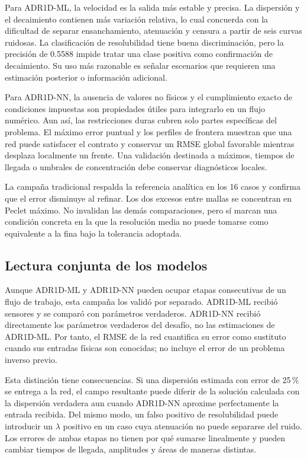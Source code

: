 \documentclass[11pt,a4paper]{article}
\begin{document}
Para ADR1D-ML, la velocidad es la salida más estable y precisa. La dispersión y
el decaimiento contienen más variación relativa, lo cual concuerda con la
dificultad de separar ensanchamiento, atenuación y censura a partir de seis
curvas ruidosas. La clasificación de resolubilidad tiene buena discriminación,
pero la precisión de 0.5588 impide tratar una clase positiva como confirmación
de decaimiento. Su uso más razonable es señalar escenarios que requieren una
estimación posterior o información adicional.

Para ADR1D-NN, la ausencia de valores no físicos y el cumplimiento exacto de
condiciones impuestas son propiedades útiles para integrarlo en un flujo
numérico. Aun así, las restricciones duras cubren solo partes específicas del
problema. El máximo error puntual y los perfiles de frontera muestran que una
red puede satisfacer el contrato y conservar un RMSE global favorable mientras
desplaza localmente un frente. Una validación destinada a máximos, tiempos de
llegada o umbrales de concentración debe conservar diagnósticos locales.

La campaña tradicional respalda la referencia analítica en los 16 casos y
confirma que el error disminuye al refinar. Los dos excesos entre mallas se
concentran en Peclet máximo. No invalidan las demás comparaciones, pero sí
marcan una condición concreta en la que la resolución media no puede tomarse
como equivalente a la fina bajo la tolerancia adoptada.

\subsection{Lectura conjunta de los modelos}

Aunque ADR1D-ML y ADR1D-NN pueden ocupar etapas consecutivas de un flujo de
trabajo, esta campaña los validó por separado. ADR1D-ML recibió sensores y se
comparó con parámetros verdaderos. ADR1D-NN recibió directamente los parámetros
verdaderos del desafío, no las estimaciones de ADR1D-ML. Por tanto, el RMSE de
la red cuantifica su error como sustituto cuando sus entradas físicas son
conocidas; no incluye el error de un problema inverso previo.

Esta distinción tiene consecuencias. Si una dispersión estimada con error de
25\,\% se entrega a la red, el campo resultante puede diferir de la solución
calculada con la dispersión verdadera aun cuando ADR1D-NN aproxime perfectamente
la entrada recibida. Del mismo modo, un falso positivo de resolubilidad puede
introducir un $\lambda$ positivo en un caso cuya atenuación no puede separarse
del ruido. Los errores de ambas etapas no tienen por qué sumarse linealmente y
pueden cambiar tiempos de llegada, amplitudes y áreas de maneras distintas.
\end{document}
